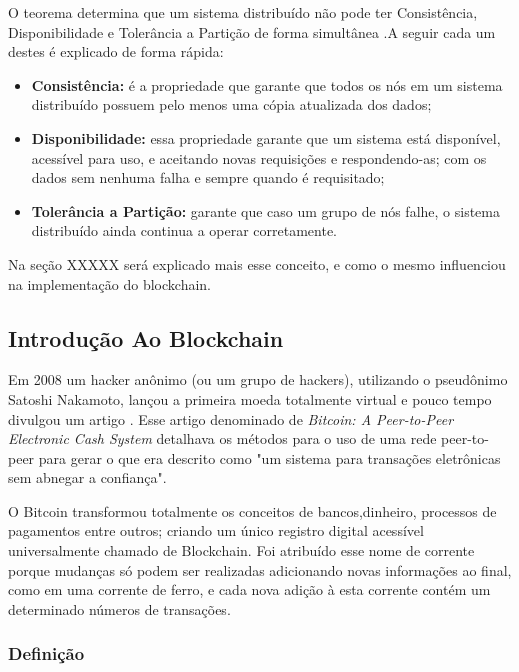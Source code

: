         O teorema determina que um sistema distribuído não pode ter Consistência, Disponibilidade e Tolerância a Partição de forma simultânea \cite{brewer_distributed}.A
        seguir cada um destes é explicado de forma rápida:

        \begin{itemize}
            \item \textbf{Consistência:} é a propriedade que garante que todos os nós em um sistema distribuído possuem pelo menos uma cópia atualizada dos dados;
            \item \textbf{Disponibilidade:} essa propriedade garante que um sistema está disponível, acessível para uso, e aceitando novas requisições e respondendo-as;
        com os dados sem nenhuma falha e sempre quando é requisitado;
            \item \textbf{Tolerância a Partição:} garante que caso um grupo de nós falhe, o sistema distribuído ainda continua a operar corretamente.
        \end{itemize}
    
    Na seção XXXXX será explicado mais esse conceito, e como o mesmo influenciou na implementação do blockchain.

   
\subsection[]{Introdução Ao Blockchain}

    
    Em 2008 um hacker anônimo (ou um grupo de hackers), utilizando o pseudônimo Satoshi Nakamoto, lançou a primeira moeda totalmente virtual e pouco tempo divulgou um artigo \cite{bitcoin_satoshi}. Esse artigo
    denominado de \textit{Bitcoin: A Peer-to-Peer Electronic Cash System} detalhava os métodos para o uso de uma rede peer-to-peer para gerar o que era descrito como "um sistema para transações eletrônicas sem abnegar a confiança".
    
    O Bitcoin transformou totalmente os conceitos de bancos,dinheiro, processos de pagamentos entre outros; criando um único registro digital acessível universalmente chamado de Blockchain. Foi atribuído esse nome de corrente porque mudanças só podem ser realizadas adicionando novas informações ao final, como em uma corrente de ferro, e cada nova adição à esta corrente contém um determinado números de transações.

    \subsubsection{Definição}

